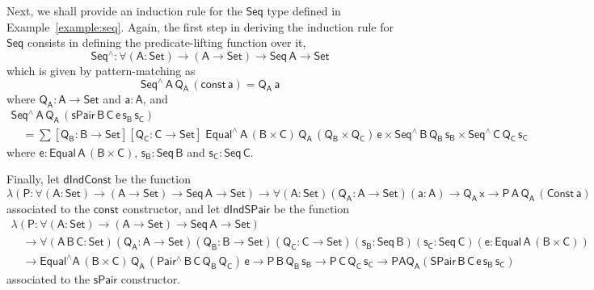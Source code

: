 \documentclass[9pt]{entcs}
\begin{document}
Next, we shall provide an induction rule for the $\mathsf{Seq}$ type defined in Example~\ref{example:seq}.
Again, the first step in deriving the induction rule for $\mathsf{Seq}$ consists in defining the predicate-lifting function over it, 
\[
\mathsf{Seq^{\wedge} : \forall (A : Set) \to (A \to Set) \to Seq\,A \to Set}
\]
which is given by pattern-matching as
\[
\mathsf{Seq^{\wedge}\,A\,Q_A\,(const\,a) = Q_A\,a}
\]
where $\mathsf{Q_A : A \to Set}$ and $\mathsf{a : A}$,
and
\[
\begin{array}{l}
\mathsf{Seq^{\wedge}\,A\,Q_A\,(sPair\,B\,C\,e\,s_B\,s_C)} \\
\quad\mathsf{=
\sum [Q_B : B \to Set] [Q_C : C \to Set]\;
Equal^{\wedge}\,A\, (B \times C)\, Q_A\, (Q_B \times Q_C) \, e \times Seq^{\wedge}\,B\,Q_B\,s_B \times Seq^{\wedge}\,C\,Q_C\,s_C
}
\end{array}
\]
where $\mathsf{e : Equal\,A\,(B \times C)}$,
$\mathsf{s_B : Seq\,B}$ and $\mathsf{s_C : Seq\,C}$.

Finally, let $\mathsf{dIndConst}$ be the function
\[
\mathsf{
\lambda (P : \forall (A : Set) \to (A \to Set) \to Seq\,A \to Set)
\to \forall (A : Set) (Q_A : A \to Set) (a : A)
\to Q_A\,x \to P\,A\,Q_A\,(Const\,a)
}
\]
associated to the $\mathsf{const}$ constructor,
and let $\mathsf{dIndSPair}$ be the function
\[
\begin{array}{l}
\mathsf{\lambda (P : \forall (A : Set) \to (A \to Set) \to Seq\,A \to Set)} \\
\quad \mathsf{\to \forall (A\,B\,C : Set) (Q_A : A \to Set) (Q_B : B \to Set) (Q_C : C \to Set)(s_B : Seq\,B) (s_C : Seq\,C) (e : Equal\,A\,(B \times C))} \\
\quad \mathsf{\to Equal^{\wedge} A\, (B \times C)\, Q_A\, (Pair^{\wedge}\,B\,C\,Q_B\,Q_C)\, e
	\to P\,B\,Q_B\,s_B \to P\,C\,Q_C\,s_C
	\to P A Q_A ( SPair\,B\,C\,e\,s_B\,s_C )}
\end{array}
\]
associated to the $\mathsf{sPair}$ constructor.
\end{document}
